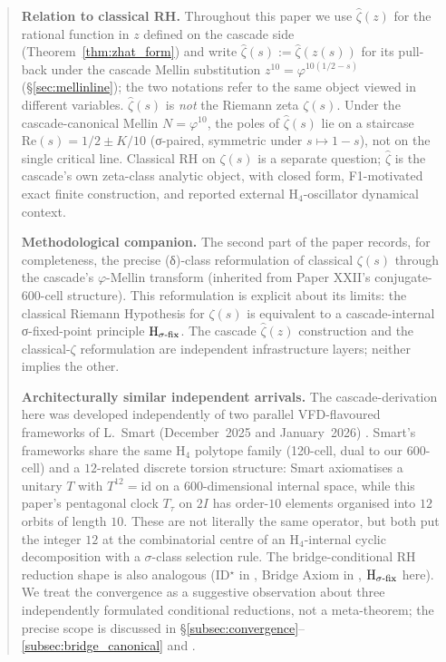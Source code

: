 \documentclass[11pt, a4paper]{amsart}
\theoremstyle{definition}
\newcommand{\pphi}{\varphi}
\begin{document}
\begin{abstract}
\noindent\textbf{Relation to classical RH.}  Throughout this paper
we use $\widehat\zeta(z)$ for the rational function in $z$ defined
on the cascade side (Theorem~\ref{thm:zhat_form}) and write
$\widehat\zeta(s) := \widehat\zeta(z(s))$ for its pull-back under the
cascade Mellin substitution $z^{10} = \varphi^{10(1/2-s)}$
(\S\ref{sec:mellinline}); the two notations refer to the same
object viewed in different variables. $\widehat\zeta(s)$ is
\emph{not} the Riemann zeta $\zeta(s)$. Under the cascade-canonical
Mellin $N = \varphi^{10}$, the poles of $\widehat\zeta(s)$ lie on a
staircase $\mathrm{Re}(s) = 1/2 \pm K/10$ (σ-paired, symmetric under
$s \mapsto 1-s$), not on the single critical line. Classical RH
on $\zeta(s)$ is a separate question; $\widehat\zeta$ is the cascade's
own zeta-class analytic object, with closed form,
F1-motivated exact finite construction, and reported external
H$_4$-oscillator dynamical context.

\noindent\textbf{Methodological companion.} The second part of the
paper records, for completeness, the precise (δ)-class reformulation
of classical $\zeta(s)$ through the cascade's $\pphi$-Mellin transform
(inherited from Paper XXII's conjugate-600-cell structure). This
reformulation is explicit about its limits: the classical Riemann
Hypothesis for $\zeta(s)$ is equivalent to a cascade-internal
σ-fixed-point principle $\textup{H}_{\sigma\text{-fix}}$. The cascade
$\widehat\zeta(z)$ construction and the classical-$\zeta$ reformulation
are independent infrastructure layers; neither implies the other.

\noindent\textbf{Architecturally similar independent arrivals.}
The cascade-derivation here was developed independently of two
parallel VFD-flavoured frameworks of L.~Smart (December~2025
and January~2026)
\cite{SmartCanonicalFramework, SmartPaperII, SmartPaperC}.
Smart's frameworks share the same H$_4$ polytope family
(120-cell, dual to our 600-cell) and a $12$-related discrete
torsion structure: Smart axiomatises a unitary $T$ with
$T^{12} = \mathrm{id}$ on a 600-dimensional internal space, while
this paper's pentagonal clock $T_\tau$ on $2I$ has order-$10$
elements organised into $12$ orbits of length $10$.  These are not
literally the same operator, but both put the integer $12$ at the
combinatorial centre of an H$_4$-internal cyclic decomposition with
a $\sigma$-class selection rule.  The bridge-conditional RH
reduction shape is also analogous (ID$^\star$ in
\cite{SmartPaperII}, Bridge Axiom in \cite{SmartPaperC},
$\textup{H}_{\sigma\text{-fix}}$ here).  We treat the convergence
as a suggestive observation about three independently formulated
conditional reductions, not a meta-theorem; the precise scope is
discussed in \S\ref{subsec:convergence}--\ref{subsec:bridge_canonical}
and \cite{ConvergenceWithSmart}.
\end{abstract}
\end{document}
